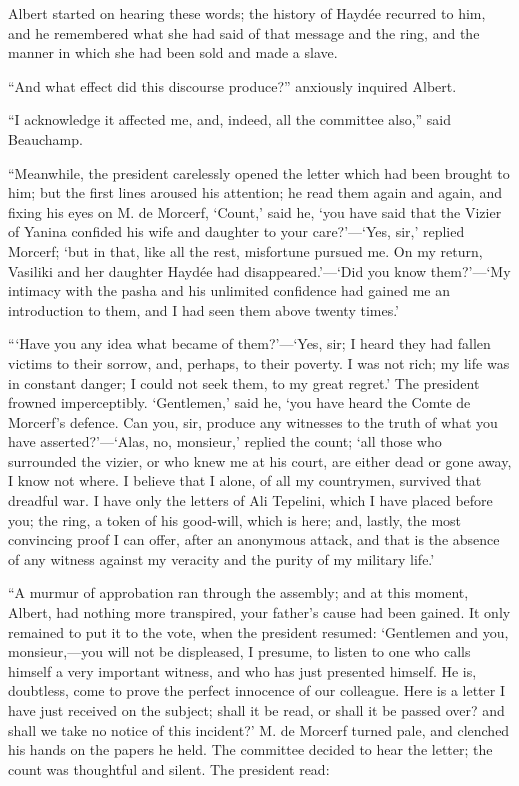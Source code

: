Albert started on hearing these words; the history of Haydée recurred
to him, and he remembered what she had said of that message and the
ring, and the manner in which she had been sold and made a slave.

“And what effect did this discourse produce?” anxiously inquired
Albert.

“I acknowledge it affected me, and, indeed, all the committee also,”
said Beauchamp.

“Meanwhile, the president carelessly opened the letter which had been
brought to him; but the first lines aroused his attention; he read them
again and again, and fixing his eyes on M. de Morcerf, ‘Count,’ said
he, ‘you have said that the Vizier of Yanina confided his wife and
daughter to your care?’—‘Yes, sir,’ replied Morcerf; ‘but in that, like
all the rest, misfortune pursued me. On my return, Vasiliki and her
daughter Haydée had disappeared.’—‘Did you know them?’—‘My intimacy
with the pasha and his unlimited confidence had gained me an
introduction to them, and I had seen them above twenty times.’

“‘Have you any idea what became of them?’—‘Yes, sir; I heard they had
fallen victims to their sorrow, and, perhaps, to their poverty. I was
not rich; my life was in constant danger; I could not seek them, to my
great regret.’ The president frowned imperceptibly. ‘Gentlemen,’ said
he, ‘you have heard the Comte de Morcerf’s defence. Can you, sir,
produce any witnesses to the truth of what you have asserted?’—‘Alas,
no, monsieur,’ replied the count; ‘all those who surrounded the vizier,
or who knew me at his court, are either dead or gone away, I know not
where. I believe that I alone, of all my countrymen, survived that
dreadful war. I have only the letters of Ali Tepelini, which I have
placed before you; the ring, a token of his good-will, which is here;
and, lastly, the most convincing proof I can offer, after an anonymous
attack, and that is the absence of any witness against my veracity and
the purity of my military life.’

“A murmur of approbation ran through the assembly; and at this moment,
Albert, had nothing more transpired, your father’s cause had been
gained. It only remained to put it to the vote, when the president
resumed: ‘Gentlemen and you, monsieur,—you will not be displeased, I
presume, to listen to one who calls himself a very important witness,
and who has just presented himself. He is, doubtless, come to prove the
perfect innocence of our colleague. Here is a letter I have just
received on the subject; shall it be read, or shall it be passed over?
and shall we take no notice of this incident?’ M. de Morcerf turned
pale, and clenched his hands on the papers he held. The committee
decided to hear the letter; the count was thoughtful and silent. The
president read:

